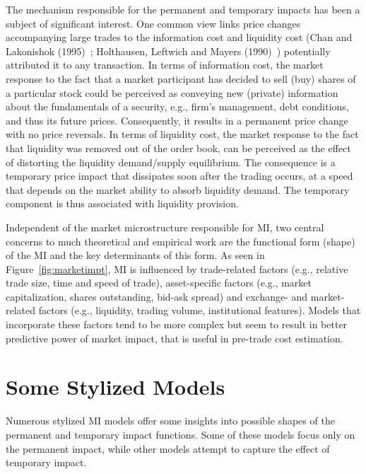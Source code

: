The mechanism responsible for the permanent and temporary impacts has been a subject of significant interest. One common view links price changes accompanying large trades to the information cost and liquidity cost (Chan and Lakonishok (1995)~\cite{chan1995}; Holthausen, Leftwich and Mayers (1990)~\cite{holthausen1990}) potentially attributed it to any transaction. In terms of information cost, the market response to the fact that a market participant has decided to sell (buy) shares of a particular stock could be perceived as conveying new (private) information about the fundamentals of a security, e.g., firm's management, debt conditions, and thus its future prices. Consequently, it results in a permanent price change with no price reversals. In terms of liquidity cost, the market response to the fact that liquidity was removed out of the order book, can be perceived as the effect of distorting the liquidity demand/supply equilibrium. The consequence is a temporary price impact that dissipates soon after the trading occurs, at a speed that depends on the market ability to absorb liquidity demand. The temporary component is thus associated with liquidity provision. 


Independent of the market microstructure responsible for MI, two central concerns to much theoretical and empirical work are the functional form (shape) of the MI and the key determinants of this form. As seen in Figure~\ref{fig:marketimpt}, MI is influenced by trade-related factors (e.g., relative trade size, time and speed of trade), asset-specific factors (e.g., market capitalization, shares outstanding, bid-ask spread) and exchange- and market-related factors (e.g., liquidity, trading volume, institutional features). Models that incorporate these factors tend to be more complex but seem to result in better predictive power of market impact, that is useful in pre-trade cost estimation.



\section{Some Stylized Models\label{sec:some_style_model}}\label{in:style9}

Numerous stylized MI models offer some insights into possible shapes of the permanent and temporary impact functions. Some of these models focus only on the permanent impact, while other models attempt to capture the effect of temporary impact. \twomedskip


